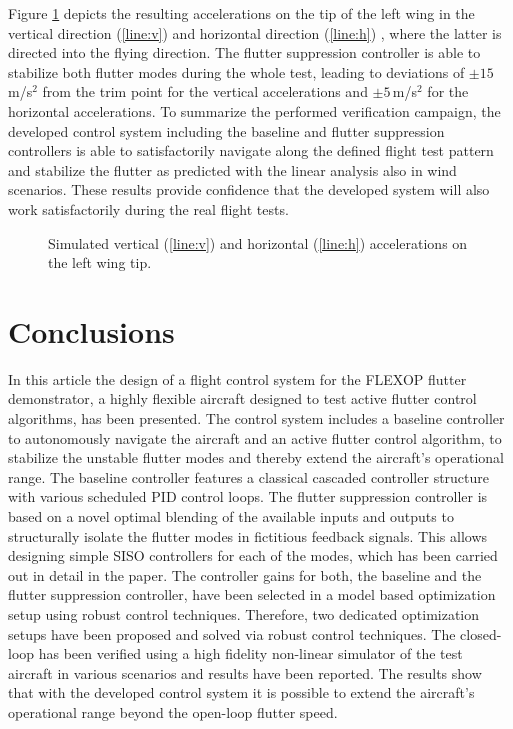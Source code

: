 \documentclass[aerospace,article,submit,moreauthors,pdftex,10pt,a4paper]{Definitions/mdpi}
\begin{document}
Figure \ref{fig:d1_patt_acc} depicts the resulting accelerations on the tip of the left wing in the vertical direction (\ref{line:v}) and horizontal direction (\ref{line:h}) , where the latter is directed into the flying direction. The flutter suppression controller is able to stabilize both flutter modes during the whole test, leading to deviations of $\pm15$\,m/s$^2$ from the trim point for the vertical accelerations and $\pm5$\,m/s$^2$ for the horizontal accelerations. To summarize the performed verification campaign, the developed control system including the baseline and flutter suppression controllers is able to satisfactorily navigate along the defined flight test pattern  and stabilize the flutter as predicted with the linear analysis also in wind scenarios. These results provide confidence that the developed system will also work satisfactorily during the real flight tests.



\begin{figure}[h]
	\centering
	
	\caption{Simulated vertical (\ref{line:v}) and horizontal (\ref{line:h}) accelerations on the left wing tip.}
	\label{fig:d1_patt_acc}	
\end{figure}



\section{Conclusions}
In this article the design of a  flight control system for the FLEXOP flutter demonstrator, a highly flexible aircraft designed to test active flutter control algorithms, has been presented. The control system includes a baseline controller to autonomously navigate the aircraft and an active flutter control algorithm, to stabilize the unstable flutter modes and thereby extend the aircraft's operational range.
The baseline controller features a classical cascaded controller structure with various scheduled PID control loops. The flutter suppression controller is based on a novel optimal blending of the available inputs and outputs to structurally isolate the flutter modes in fictitious feedback signals. This allows designing simple SISO controllers for each of the modes, which has been carried out in detail in the paper. The controller gains for both, the baseline and the flutter suppression controller, have been selected in a model based optimization setup using robust control techniques. Therefore, two dedicated optimization setups have been proposed and solved via robust control techniques. The closed-loop has been verified using a high fidelity non-linear simulator of the test aircraft in various scenarios and results have been reported. The results show that with the developed control system it is possible to extend the aircraft's operational range beyond the open-loop flutter speed.
\end{document}
